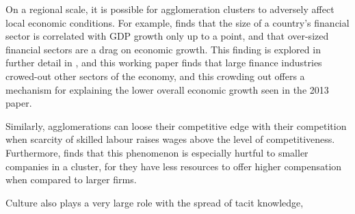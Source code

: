 \documentclass[12pt,letterpaper,notitlepage,onecolumn,final,openbib]{article}
\begin{document}
On a regional scale, it is possible for agglomeration clusters to adversely affect local economic conditions.  For example,  finds that the size of a country's financial sector is correlated with GDP growth only up to a point, and that over-sized financial sectors are a drag on economic growth.  This finding is explored in further detail in , and this working paper finds that large finance industries crowed-out other sectors of the economy, and this crowding out offers a mechanism for explaining the lower overall economic growth seen in the 2013 paper. 

Similarly, agglomerations can loose their competitive edge with their competition when scarcity of skilled labour raises wages above the level of competitiveness.  Furthermore,  finds that this phenomenon is especially hurtful to smaller companies in a cluster, for they have less resources to offer higher compensation when compared to larger firms.  

Culture also plays a very large role with the spread of tacit knowledge, 
%

%
%	
%			
\end{document}
